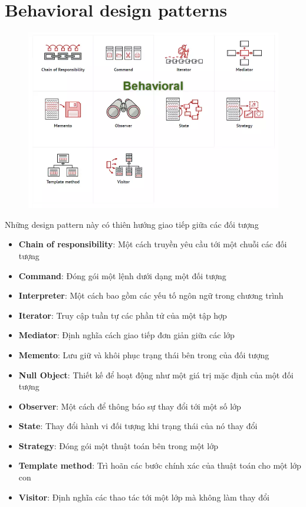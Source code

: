 \section{Behavioral design patterns}
\begin{figure}[!htb]
    \centering
    \includegraphics[width=\textwidth]{fig/Introduction/behavioral.png}
\end{figure}
Những design pattern này có thiên hướng giao tiếp giữa các đối tượng
\begin{itemize}
    \item \textbf{Chain of responsibility}: Một cách truyền yêu cầu tới một chuỗi các đối tượng
    \item \textbf{Command}: Đóng gói một lệnh dưới dạng một đối tượng
    \item \textbf{Interpreter}: Một cách bao gồm các yếu tố ngôn ngữ trong chương trình
    \item \textbf{Iterator}: Truy cập tuần tự các phần tử của một tập hợp
    \item \textbf{Mediator}: Định nghĩa cách giao tiếp đơn giản giữa các lớp
    \item \textbf{Memento}: Lưu giữ và khôi phục trạng thái bên trong của đối tượng
    \item \textbf{Null Object}: Thiết kế để hoạt động như một giá trị mặc định của một đối tượng
    \item \textbf{Observer}: Một cách để thông báo sự thay đổi tới một số lớp
    \item \textbf{State}: Thay đổi hành vi đối tượng khi trạng thái của nó thay đổi
    \item \textbf{Strategy}: Đóng gói một thuật toán bên trong một lớp
    \item \textbf{Template method}: Trì hoãn các bước chính xác của thuật toán cho một lớp con
    \item \textbf{Visitor}: Định nghĩa các thao tác tới một lớp mà không làm thay đổi
\end{itemize}


\newpage


